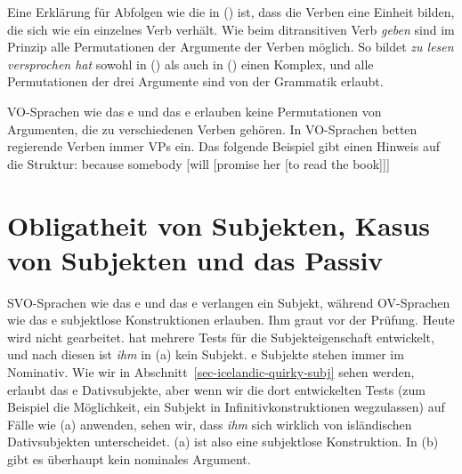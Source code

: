 Eine Erklärung für Abfolgen wie die in () ist, dass die Verben eine Einheit bilden, die sich wie ein einzelnes Verb verhält. Wie beim
ditransitiven Verb \emph{geben} sind im Prinzip alle Permutationen der Argumente der Verben
möglich. So bildet \emph{zu lesen versprochen hat} sowohl in () als auch in
() einen Komplex, und alle Permutationen der drei Argumente sind von der Grammatik erlaubt.

VO-Sprachen wie das e und das e erlauben keine Permutationen von Argumenten, die zu verschiedenen
Verben gehören. In VO-Sprachen betten regierende Verben immer VPs ein. Das folgende Beispiel gibt einen Hinweis auf die
Struktur:
\ea
because somebody [will [promise her [to read the book]]]
\z
{}

\section{Obligatheit von Subjekten, Kasus von Subjekten und das Passiv}

SVO-Sprachen wie das e und das e verlangen ein Subjekt, während OV-Sprachen wie das e
subjektlose Konstruktionen erlauben.
\eal
\ex
Ihm graut vor der Prüfung.\german
\ex
Heute wird nicht gearbeitet.
\zl
\citet{Reis82} hat mehrere Tests für die Subjekteigenschaft entwickelt, und nach diesen ist \emph{ihm} in
(a) kein Subjekt. e Subjekte stehen immer im Nominativ. Wie wir in Abschnitt~\ref{sec-icelandic-quirky-subj} sehen werden,
erlaubt das e Dativsubjekte, aber wenn wir die dort entwickelten Tests (zum Beispiel die Möglichkeit, ein
Subjekt in Infinitivkonstruktionen wegzulassen) auf Fälle wie (a) anwenden, sehen wir, dass \emph{ihm}
sich wirklich von isländischen Dativsubjekten unterscheidet. (a) ist also eine subjektlose Konstruktion.
In (b) gibt es überhaupt kein nominales Argument.

